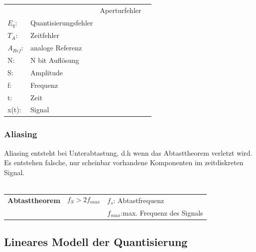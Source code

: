 \begin{longtable}[c]{ l  l l l }
\begin{minipage}{5cm}
\end{minipage}

&
\begin{minipage}{5cm}
\begin{tabular}{ll}
$E_{A}$: &Aperturfehler\\
$E_{q}$:&Quantisierungsfehler\\
$T_{A}$:&Zeitfehler\\
$A_{Ref}$:&analoge Referenz\\
N:& N bit Auflösung\\
S: &Amplitude\\
f: &Frequenz\\
t: &Zeit\\
x(t):&Signal
\end{tabular}


\end{minipage}
\\
\end{longtable}


\subsubsection{Aliasing}
Aliasing entsteht bei Unterabtastung, d.h wenn das Abtasttheorem verletzt wird.
Es entstehen falsche, nur scheinbar vorhandene Komponenten im zeitdiskreten
Signal.\\
\\

\begin{tabular}{lll}
\small\textbf{Abtasttheorem}
&
\begin{minipage}{4cm}
\begin{equation}
f_{S}>2f_{max}
\end{equation}
\end{minipage}
&$f_{s}$: Abtastfrequenz\\
&&$f_{max}$:max. Frequenz des Signals
\end{tabular}

\subsection{Lineares Modell der Quantisierung}
